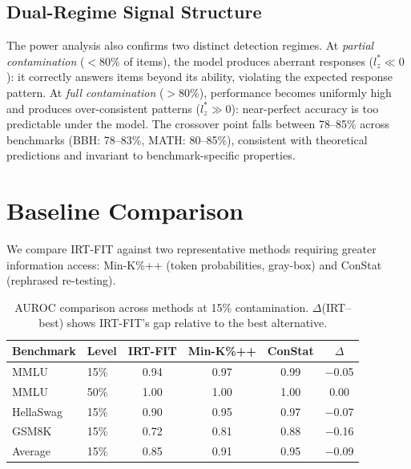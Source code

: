 \documentclass[11pt,a4paper]{article}
\begin{document}
\subsection{Dual-Regime Signal Structure}

The power analysis also confirms two distinct detection regimes.
At \emph{partial contamination} ($<$80\% of items), the model produces aberrant responses ($l_{z}^{*} \ll 0$): it correctly answers items beyond its ability, violating the expected response pattern.
At \emph{full contamination} ($>$80\%), performance becomes uniformly high and produces over-consistent patterns ($l_{z}^{*} \gg 0$): near-perfect accuracy is too predictable under the model.
The crossover point falls between 78--85\% across benchmarks (BBH: 78--83\%, MATH: 80--85\%), consistent with theoretical predictions and invariant to benchmark-specific properties.

\section{Baseline Comparison}
\label{sec:baselines}

We compare IRT-FIT against two representative methods requiring greater information access: Min-K\%++ \citep{shi2024detecting} (token probabilities, gray-box) and ConStat \citep{dekoninck2024constat} (rephrased re-testing).

\begin{table}[t]
\centering
\caption{AUROC comparison across methods at 15\% contamination. $\Delta$(IRT--best) shows IRT-FIT's gap relative to the best alternative.}
\label{tab:baselines}
\begin{tabular}{llcccc}
\toprule
Benchmark & Level & IRT-FIT & Min-K\%++ & ConStat & $\Delta$ \\
\midrule
MMLU & 15\% & 0.94 & 0.97 & 0.99 & $-$0.05 \\
MMLU & 50\% & 1.00 & 1.00 & 1.00 & 0.00 \\
HellaSwag & 15\% & 0.90 & 0.95 & 0.97 & $-$0.07 \\
GSM8K & 15\% & 0.72 & 0.81 & 0.88 & $-$0.16 \\
\midrule
Average & 15\% & 0.85 & 0.91 & 0.95 & $-$0.09 \\
\bottomrule
\end{tabular}
\end{table}
\end{document}
